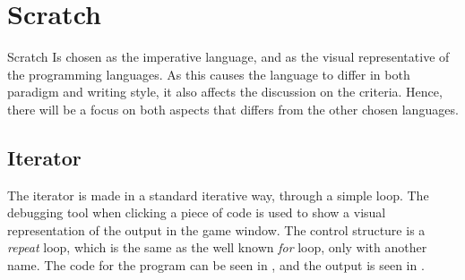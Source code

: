 \section{Scratch}
\label{sec:scratch}

Scratch Is chosen as the imperative language, and as the visual representative of the programming languages. As this causes the language to differ in both paradigm and writing style, it also affects the discussion on the criteria. Hence, there will be a focus on both aspects that differs from the other chosen languages.

\subsection{Iterator}
The iterator is made in a standard iterative way, through a simple loop. The debugging tool when clicking a piece of code is used to show a visual representation of the output in the game window. The control structure is a \emph{repeat} loop, which is the same as the well known \emph{for} loop, only with another name. The code for the program can be seen in , and the output is seen in .

